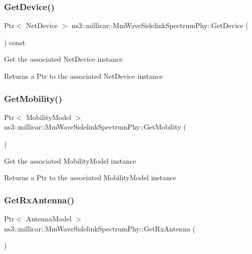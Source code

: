 \subsubsection{\texorpdfstring{Get\+Device()}{GetDevice()}}
{\footnotesize\ttfamily Ptr$<$ Net\+Device $>$ ns3\+::millicar\+::\+Mm\+Wave\+Sidelink\+Spectrum\+Phy\+::\+Get\+Device (\begin{DoxyParamCaption}{ }\end{DoxyParamCaption}) const}

Get the associated Net\+Device instance

\begin{DoxyReturn}{Returns}
a Ptr to the associated Net\+Device instance 
\end{DoxyReturn}
\mbox{\label{classns3_1_1millicar_1_1MmWaveSidelinkSpectrumPhy_a32642929c3eafdf82ae27e6b9ece29cf}} 
\subsubsection{\texorpdfstring{Get\+Mobility()}{GetMobility()}}
{\footnotesize\ttfamily Ptr$<$ Mobility\+Model $>$ ns3\+::millicar\+::\+Mm\+Wave\+Sidelink\+Spectrum\+Phy\+::\+Get\+Mobility (\begin{DoxyParamCaption}{ }\end{DoxyParamCaption})}

Get the associated Mobility\+Model instance

\begin{DoxyReturn}{Returns}
a Ptr to the associated Mobility\+Model instance 
\end{DoxyReturn}
\mbox{\label{classns3_1_1millicar_1_1MmWaveSidelinkSpectrumPhy_a1a7c251de6b22c5afbafcf5937a12082}} 
\subsubsection{\texorpdfstring{Get\+Rx\+Antenna()}{GetRxAntenna()}}
{\footnotesize\ttfamily Ptr$<$ Antenna\+Model $>$ ns3\+::millicar\+::\+Mm\+Wave\+Sidelink\+Spectrum\+Phy\+::\+Get\+Rx\+Antenna (\begin{DoxyParamCaption}{ }\end{DoxyParamCaption})}

